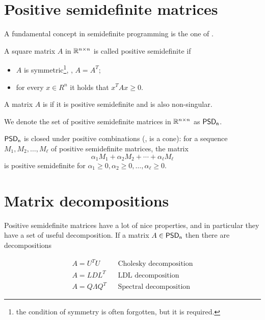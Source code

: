 \documentclass[a4paper,twoside,justified]{tufte-handout}
\begin{document}
 

\section{Positive semidefinite matrices}

A fundamental concept in semidefinite programming is the one of
. 
\begin{definition}
  A square matrix $A$ in $ \RR^{n\times n} $ is called positive
  semidefinite if 
  \begin{itemize}
    \item $A$ is symmetric\footnote{the condition of symmetry is often
      forgotten, but it is required.}, \ie, $ A=A^{T} $;
    \item for every $ x\in R^{n} $ it holds that $ x^{T} A x \geq 0 $.
  \end{itemize}
  A matrix $ A $ is  if it is
  positive semidefinite and is also non-singular.
\end{definition}
We denote the set of positive semidefinite matrices in $\RR^{n\times
  n}$ as $\positivesemidefinite$.

\begin{fact}
  $ \positivesemidefinite $ is closed under positive
  combinations (\ie, is a cone): for a sequence $ M_{1}, M_{2}, \ldots, M_{\ell} $ of positive
  semidefinite matrices, the matrix 
\begin{equation}
  \alpha_{1} M_{1} + \alpha_{2} M_{2} + \cdots + \alpha_{\ell} M_{\ell}
\end{equation}
is positive semidefinite for $ \alpha_{1}\geq 0, \alpha_{2}\geq 0,
\ldots , \alpha_{\ell} \geq 0$.
\end{fact}

\section{Matrix decompositions}

Positive semidefinite matrices have a lot of nice properties, and in
particular they have a set of useful decomposition. If a matrix $ A
\in \positivesemidefinite[n] $ then there are decompositions

\begin{align}
  A = U^{T}U & & \text{Cholesky decomposition}\\
  A = L D L^{T} & & \text{LDL decomposition}\\
  A = Q \Lambda Q^{T} & & \text{Spectral decomposition}
\end{align}
\end{document}
